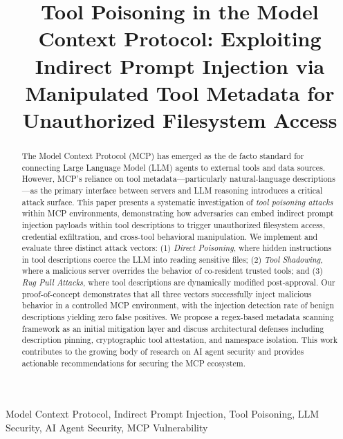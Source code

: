 \documentclass[conference]{IEEEtran}
\begin{document}
\title{Tool Poisoning in the Model Context Protocol: Exploiting Indirect Prompt Injection via Manipulated Tool Metadata for Unauthorized Filesystem Access}

\author{
}

\maketitle

\begin{abstract}
The Model Context Protocol (MCP) has emerged as the de facto standard for connecting Large Language Model (LLM) agents to external tools and data sources. However, MCP's reliance on tool metadata—particularly natural-language descriptions—as the primary interface between servers and LLM reasoning introduces a critical attack surface. This paper presents a systematic investigation of \textit{tool poisoning attacks} within MCP environments, demonstrating how adversaries can embed indirect prompt injection payloads within tool descriptions to trigger unauthorized filesystem access, credential exfiltration, and cross-tool behavioral manipulation. We implement and evaluate three distinct attack vectors: (1) \textit{Direct Poisoning}, where hidden instructions in tool descriptions coerce the LLM into reading sensitive files; (2) \textit{Tool Shadowing}, where a malicious server overrides the behavior of co-resident trusted tools; and (3) \textit{Rug Pull Attacks}, where tool descriptions are dynamically modified post-approval. Our proof-of-concept demonstrates that all three vectors successfully inject malicious behavior in a controlled MCP environment, with the injection detection rate of benign descriptions yielding zero false positives. We propose a regex-based metadata scanning framework as an initial mitigation layer and discuss architectural defenses including description pinning, cryptographic tool attestation, and namespace isolation. This work contributes to the growing body of research on AI agent security and provides actionable recommendations for securing the MCP ecosystem.
\end{abstract}

\begin{IEEEkeywords}
Model Context Protocol, Indirect Prompt Injection, Tool Poisoning, LLM Security, AI Agent Security, MCP Vulnerability
\end{IEEEkeywords}
\end{document}
